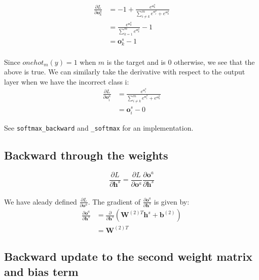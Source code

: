 \documentclass[reqno]{amsart}
\theoremstyle{definition}
\theoremstyle{remark}
\numberwithin{equation}{section}
\begin{document}
\begin{align}
    \frac{\partial L}{\partial \mathbf{o}_k^a} &=
        -1 + \frac{e^{\mathbf{o}_k^a}}{\sum_{i \neq k}^m e^{\mathbf{o}_i^a} + e^{\mathbf{o}_k^a}} \\
    &= \frac{e^{\mathbf{o}_k^a}}{\sum_{k=1}^m e^{\mathbf{o}_k^a}} -1 \\
    &= \mathbf{o}^s_k - 1
\end{align} \\

Since $onehot_m(y) = 1$ when $m$ is the target and is $0$ otherwise, we see that the above is true. We can similarly take the derivative with respect to the output layer when we have the incorrect class i: \\

\begin{align}
    \frac{\partial L}{\partial \mathbf{o}_i^a} &=
        \frac{e^{\mathbf{o}_i^a}}{\sum_{i \neq k}^m e^{\mathbf{o}_i^a} + e^{\mathbf{o}_k^a}} \\
    &= \mathbf{o}^s_i - 0
\end{align}

See \texttt{softmax\_backward} and \texttt{\_softmax} for an implementation.

    \subsection{Backward through the weights}

\begin{equation}
    \frac{\partial L}{\partial \mathbf{h}^s} = \frac{\partial L}{\partial \mathbf{o}^a} \frac{\partial \mathbf{o}^a}{\partial \mathbf{h}^s}
\end{equation}\\

We have aleady defined $\frac{\partial L}{\partial \mathbf{o}^a}$. The gradient of $\frac{\partial \mathbf{o}^a}{\partial \mathbf{h}^s}$ is given by:\\

\begin{align}
    \frac{\partial \mathbf{o}^a}{\partial \mathbf{h}^s} &= \frac{\partial}{\partial \mathbf{h}^s} (\mathbf{W}^{(2)T}\mathbf{h}^s +\mathbf{b}^{(2)})\\
    &= \mathbf{W}^{(2)T}
\end{align}

\subsection{Backward update to the second weight matrix and bias term}
\end{document}
